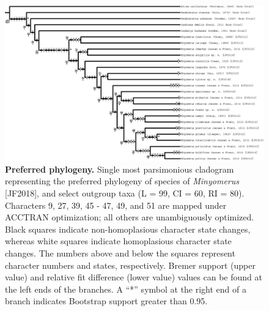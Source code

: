 \documentclass[fleqn,10pt,lineno]{wlpeerj} %
\begin{document}
\begin{figure}[h]
	\centering
	\begin{sideways}
		\includegraphics[height=0.75\textwidth]{tree.eps}
	\end{sideways}
	\caption{\textbf{Preferred phylogeny.} Single most parsimonious cladogram representing the preferred phylogeny of species of \textit{Minyomerus} [JF2018], and select outgroup taxa (L = 99, CI = 60, RI = 80). Characters 9, 27, 39, 45 - 47, 49, and 51 are mapped under ACCTRAN optimization; all others are unambiguously optimized. Black squares indicate non-homoplasious character state changes, whereas white squares indicate homoplasious character state changes. The numbers above and below the squares represent character numbers and states, respectively. Bremer support (upper value) and relative fit difference (lower value) values can be found at the left ends of the branches. A ``*'' symbol at the right end of a branch indicates Bootstrap support greater than 0.95.}
	\label{fig:tree}
\end{figure}
\end{document}
